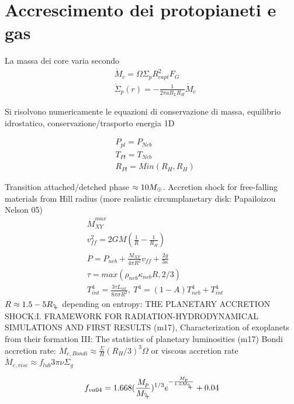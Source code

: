 \section{Accrescimento dei protopianeti e gas}

La massa dei core varia secondo
\begin{align}
&\dot{M}_c=\Omega\Sigma_pR^2_{capt}F_G\\
&\dot{\Sigma}_p(r)=-\frac{1}{2\pi aB_LR_H}\dot{M}_c
\end{align}

Si risolvono numericamente le equazioni di conservazione di massa, equilibrio idrostatico, conservazione/trasporto energia 1D

\begin{workout}
\begin{align}
&P_{pl}=P_{Neb}\\
&T_{Pl}=T_{Neb}\\
&R_{Pl}=Min(R_H,R_H)
\end{align}
\end{workout}


\begin{workout}
Transition attached/detched phase $\approx10M_{\oplus}{}$.
Accretion shock for free-falling materials from Hill radius (more realistic circumplanetary disk: Papailoizou Nelson 05)
\begin{align}
&\dot{M}_{XY}^{max}\\
&v_{ff}^2=2GM(\frac{1}{R}-\frac{1}{R_H})\\
&P=P_{neb}+\frac{\dot{M}_{XY}}{4\pi R^2}v_{ff}+\frac{2g}{3\kappa}\\
&\tau=max(\rho_{neb}\kappa_{neb}R,2/3)\\
&T^4_{int}=\frac{3\tau L_{int}}{8\pi\sigma R^2},\ T^4=(1-A)T_{neb}^4+T_{int}^4
\end{align}
$R\approx1.5-5\rjupiter{}$ depending on entropy: THE PLANETARY ACCRETION SHOCK:I. FRAMEWORK FOR RADIATION-HYDRODYNAMICAL SIMULATIONS AND FIRST RESULTS (m17), Characterization of exoplanets from their formation III: The statistics of planetary luminosities (m17)
Bondi accretion rate: $\dot{M}_{e, Bondi}\approx\frac{\Sigma}{H}(R_H/3)^3\Omega$ or viscous accretion rate $\dot{M}_{e, visc}\approx f_{lub}3\pi\nu\Sigma_g$
\end{workout}

\begin{workout}
\begin{equation}
f_{va04}=1.668(\frac{M_p}{\mjupiter{}})\expy{1/3}\exp{-\frac{M_p}{1.5\mjupiter{}}}+0.04
\end{equation}
\end{workout}

